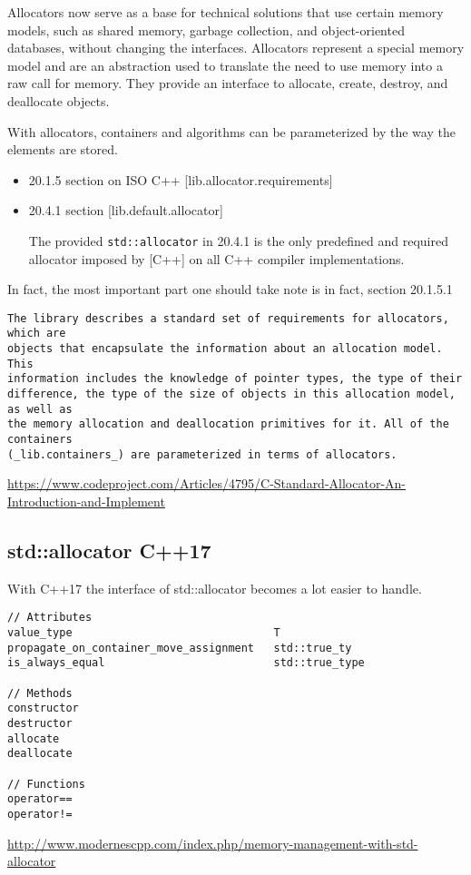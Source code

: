 Allocators now serve as a base for technical solutions that use certain memory
models, such as shared memory, garbage collection, and object-oriented
databases, without changing the interfaces. Allocators represent a special
memory model and are an abstraction used to translate the need to use memory
into a raw call for memory. They provide an interface to allocate, create,
destroy, and deallocate objects.

With allocators, containers and algorithms can be parameterized by the way the
elements are stored.
\begin{itemize}
  \item 20.1.5 section on ISO C++  [lib.allocator.requirements]
  \item 20.4.1 section [lib.default.allocator]

The provided \verb!std::allocator! in 20.4.1 is the only predefined and required
allocator imposed by [C++] on all C++ compiler implementations.

\end{itemize}
In fact, the most important part one should take note is in fact, section 20.1.5.1
\begin{verbatim}
The library describes a standard set of requirements for allocators, which are
objects that encapsulate the information about an allocation model. This
information includes the knowledge of pointer types, the type of their
difference, the type of the size of objects in this allocation model, as well as
the memory allocation and deallocation primitives for it. All of the containers
(_lib.containers_) are parameterized in terms of allocators.

\end{verbatim}

\url{https://www.codeproject.com/Articles/4795/C-Standard-Allocator-An-Introduction-and-Implement}

\subsection{std::allocator C++17}
\label{sec:std::allocator-C++17}


With C++17 the interface of std::allocator becomes a lot easier to handle. 
\begin{verbatim}
// Attributes
value_type                               T
propagate_on_container_move_assignment   std::true_ty
is_always_equal                          std::true_type

// Methods
constructor
destructor
allocate
deallocate

// Functions
operator==
operator!=
\end{verbatim}
\url{http://www.modernescpp.com/index.php/memory-management-with-std-allocator}


